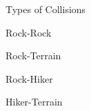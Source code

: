 \begin{frame}{Types of Collisions}
\begin{minipage}{\textwidth}
\begin{minipage}{0.24\textwidth}
        \end{minipage}
    \end{minipage}
    \begin{minipage}{\textwidth}
        \centering
        \begin{minipage}{0.24\textwidth}
            \centering
            Rock-Rock
        \end{minipage}
        \begin{minipage}{0.24\textwidth}
            \centering
            Rock-Terrain
        \end{minipage}
        \begin{minipage}{0.24\textwidth}
            \centering
            Rock-Hiker
        \end{minipage}
        \begin{minipage}{0.24\textwidth}
            \centering
            Hiker-Terrain
        \end{minipage}
    \end{minipage}
\end{frame}

